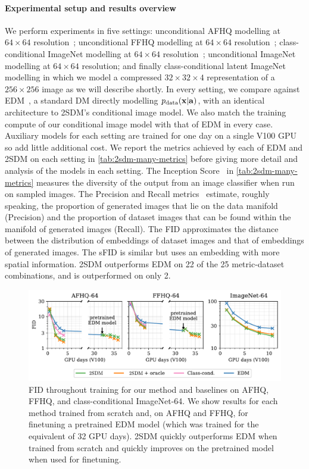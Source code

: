 \paragraph{Experimental setup and results overview}

We perform experiments in five settings: unconditional AFHQ modelling at $64\times64$ resolution~\citep{choi2020stargan}; unconditional FFHQ modelling at $64\times64$ resolution~\citep{karras2018style}; class-conditional ImageNet modelling at $64\times64$ resolution~\citep{deng2009imagenet}; unconditional ImageNet modelling at $64\times64$ resolution; and finally class-conditional latent ImageNet modelling in which we model a compressed $32\times32\times4$ representation of a $256\times256$ image as we will describe shortly. In every setting, we compare against EDM~\citep{karras2022elucidating}, a standard DM directly modelling $p_{\rm{data}}({\mathbf{x}}|{\mathbf{a}})$, with an identical architecture to 2SDM's conditional image model. We also match the training compute of our conditional image model with that of EDM in every case. Auxiliary models for each setting are trained for one day on a single V100 GPU so add little additional cost. We report the metrics achieved by each of EDM and 2SDM on each setting in \cref{tab:2sdm-many-metrics} before giving more detail and analysis of the models in each setting. The Inception Score~\citep{salimans2016improved,barratt2018note} in \cref{tab:2sdm-many-metrics} measures the diversity of the output from an image classifier when run on sampled images. The Precision and Recall metrics~\citep{kynkaanniemi2019improved} estimate, roughly speaking, the proportion of generated images that lie on the data manifold (Precision) and the proportion of dataset images that can be found within the manifold of generated images (Recall). The FID approximates the distance between the distribution of embeddings of dataset images and that of embeddings of generated images. The sFID is similar but uses an embedding with more spatial information. 2SDM outperforms EDM on 22 of the 25 metric-dataset combinations, and is outperformed on only 2.


\begin{figure}[t]
    \centering
    \includegraphics[width=\textwidth]{figs/2sdm/cond-results-1.pdf}
    \caption{FID throughout training for our method and baselines on AFHQ, FFHQ, and class-conditional ImageNet-64. We show results for each method trained from scratch and, on AFHQ and FFHQ, for finetuning a pretrained EDM model (which was trained for the equivalent of 32 GPU days). 2SDM quickly outperforms EDM when trained from scratch and quickly improves on the pretrained model when used for finetuning.}
    \label{fig:fid_vs_training}
\end{figure}


